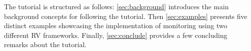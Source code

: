 The tutorial is structured as follows: \cref{sec:background} introduces the main background concepts for following the tutorial.
Then \cref{sec:examples} presents five distinct examples showcasing the implementation of monitoring using two different RV frameworks.
Finally, \cref{sec:conclude} provides a few concluding remarks about the tutorial.
